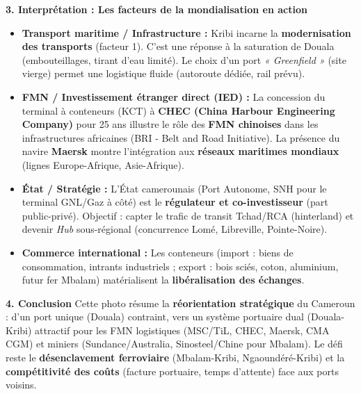 \documentclass[11pt]{article}
\begin{document}
\begin{exoresolu}
\textbf{3. Interprétation : Les facteurs de la mondialisation en action}
\begin{itemize}
    \item \textbf{Transport maritime / Infrastructure :} Kribi incarne la \textbf{modernisation des transports} (facteur 1). C'est une réponse à la saturation de Douala (embouteillages, tirant d'eau limité). Le choix d'un port \emph{« Greenfield »} (site vierge) permet une logistique fluide (autoroute dédiée, rail prévu).
    \item \textbf{FMN / Investissement étranger direct (IED) :} La concession du terminal à conteneurs (KCT) à \textbf{CHEC (China Harbour Engineering Company)} pour 25 ans illustre le rôle des \textbf{FMN chinoises} dans les infrastructures africaines (BRI - Belt and Road Initiative). La présence du navire \textbf{Maersk} montre l'intégration aux \textbf{réseaux maritimes mondiaux} (lignes Europe-Afrique, Asie-Afrique).
    \item \textbf{État / Stratégie :} L'État camerounais (Port Autonome, SNH pour le terminal GNL/Gaz à côté) est le \textbf{régulateur et co-investisseur} (part public-privé). Objectif : capter le trafic de transit Tchad/RCA (hinterland) et devenir \emph{Hub} sous-régional (concurrence Lomé, Libreville, Pointe-Noire).
    \item \textbf{Commerce international :} Les conteneurs (import : biens de consommation, intrants industriels ; export : bois sciés, coton, aluminium, futur fer Mbalam) matérialisent la \textbf{libéralisation des échanges}.
\end{itemize}

\textbf{4. Conclusion}
Cette photo résume la \textbf{réorientation stratégique} du Cameroun : d'un port unique (Douala) contraint, vers un système portuaire dual (Douala-Kribi) attractif pour les FMN logistiques (MSC/TiL, CHEC, Maersk, CMA CGM) et miniers (Sundance/Australia, Sinosteel/Chine pour Mbalam). Le défi reste le \textbf{désenclavement ferroviaire} (Mbalam-Kribi, Ngaoundéré-Kribi) et la \textbf{compétitivité des coûts} (facture portuaire, temps d'attente) face aux ports voisins.
\end{exoresolu}
\end{document}
